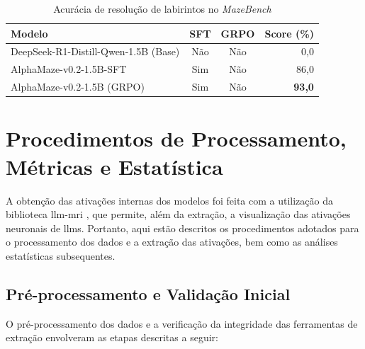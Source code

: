 \begin{table}[h!]
    \centering
    \caption{Acurácia de resolução de labirintos no \textit{MazeBench}}
    \label{tab:desempenho-mazebench}
    \begin{tabular}{|l|c|c|r|}
        \hline
        \textbf{Modelo} & \textbf{SFT} & \textbf{GRPO} & \textbf{Score (\%)} \\
        \hline
        DeepSeek-R1-Distill-Qwen-1.5B (Base) & Não & Não & 0,0 \\
        AlphaMaze-v0.2-1.5B-SFT & Sim & Não & 86,0 \\
        AlphaMaze-v0.2-1.5B (GRPO) & Sim & Não & \textbf{93,0} \\
        \hline
    \end{tabular}
\end{table}

\section{Procedimentos de Processamento, Métricas e Estatística}

A obtenção das ativações internas dos modelos foi feita com a utilização da biblioteca \gls{llm-mri} \cite{costa2024llmmri}, que permite, além da extração, a visualização das ativações neuronais de \gls{llms}. Portanto, aqui estão descritos os procedimentos adotados para o processamento dos dados e a extração das ativações, bem como as análises estatísticas subsequentes.

\subsection{Pré-processamento e Validação Inicial}

O pré-processamento dos dados e a verificação da integridade das ferramentas de extração envolveram as etapas descritas a seguir:

